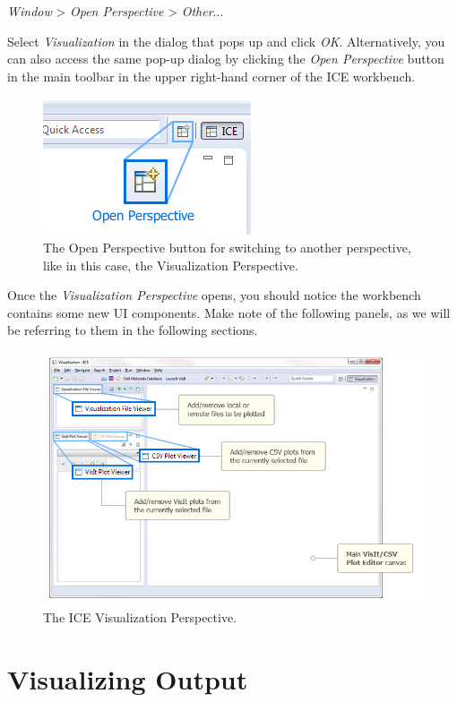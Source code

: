 \emph{Window} \textgreater{} \emph{Open Perspective} \textgreater{}
\emph{Other}...

Select \emph{Visualization} in the dialog that pops up and click
\emph{OK}. Alternatively, you can also access the same pop-up dialog by
clicking the \emph{Open Perspective} button in the main toolbar in the
upper right-hand corner of the ICE workbench.

\begin{figure}[htbp]
\centering
\includegraphics{figures/ICE_OpenPerspective.png}
\caption{The Open Perspective button for switching to another perspective, like in this case, the Visualization Perspective.}
\end{figure}

Once the \emph{Visualization Perspective} opens, you should notice the
workbench contains some new UI components. Make note of the following
panels, as we will be referring to them in the following sections.

\begin{figure}[htbp]
\centering
\includegraphics[width=\textwidth]{figures/ICE_VisualizationPerspective.png}
\caption{The ICE Visualization Perspective.}
\end{figure}

\section{Visualizing Output}\label{visualizing-output}

